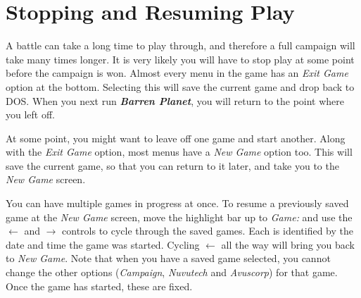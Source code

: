 \section{Stopping and Resuming Play}

\noindent
A battle can take a long time to play through, and therefore a full campaign will take many times longer. It is very likely you will have to stop play at some point before the campaign is won. Almost every menu in the game has an {\it Exit Game} option at the bottom. Selecting this will save the current game and drop back to DOS. When you next run {\bf \it Barren Planet}, you will return to the point where you left off.

At some point, you might want to leave off one game and start another. Along with the {\it Exit Game} option, most menus have a {\it New Game} option too. This will save the current game, so that you can return to it later, and take you to the {\it New Game} screen.

You can have multiple games in progress at once. To resume a previously saved game at the {\it New Game} screen, move the highlight bar up to {\it Game:} and use the $\leftarrow$ and $\rightarrow$ controls to cycle through the saved games. Each is identified by the date and time the game was started. Cycling $\leftarrow$ all the way will bring you back to {\it New Game}. Note that when you have a saved game selected, you cannot change the other options ({\it Campaign}, {\it Nuvutech} and {\it Avuscorp}) for that game. Once the game has started, these are fixed.
